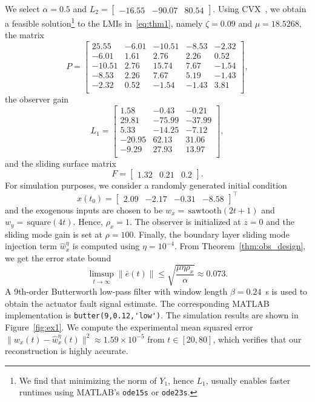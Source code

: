 \documentclass[times, doublespace]{rncauth}
\begin{document}
We select $\alpha = 0.5$ and $L_2 = \begin{bmatrix}
-16.55 & -90.07 & 80.54 
\end{bmatrix}$. Using CVX~\cite{cvx}, we obtain a feasible solution\footnote{We find that minimizing the norm of $Y_1$, hence $L_1$, usually enables faster runtimes using MATLAB's \texttt{ode15s} or \texttt{ode23s}.} to the LMIs in~\eqref{eq:thm1}, namely $\zeta = 0.09$ and $\mu=18.5268$, the matrix
\[
P = \begin{bmatrix}
25.55 & -6.01 & -10.51 & -8.53 & -2.32 \\ 
-6.01 & 1.61 & 2.76 & 2.26 & 0.52 \\ 
-10.51 & 2.76 & 15.74 & 7.67 & -1.54 \\ 
-8.53 & 2.26 & 7.67 & 5.19 & -1.43 \\ 
-2.32 & 0.52 & -1.54 & -1.43 & 3.81 \\ 
\end{bmatrix},
\]
the observer gain
\[
L_1 = \begin{bmatrix}
1.58 & -0.43 & -0.21 \\ 
29.81 & -75.99 & -37.99 \\ 
5.33 & -14.25 & -7.12 \\ 
-20.95 & 62.13 & 31.06 \\ 
-9.29 & 27.93 & 13.97 \\ 
\end{bmatrix},
\]
and the sliding surface matrix
\[
F = \begin{bmatrix}
1.32 & 0.21 & 0.2 
\end{bmatrix}.
\]
For simulation purposes, we consider a randomly generated initial condition $$x(t_0) = \begin{bmatrix}
2.09 & -2.17 & -0.31 & -8.58 
\end{bmatrix}^\top$$ and the exogenous inputs are chosen to be $w_x = \,\mathrm{sawtooth}(2t+1)$ and $w_y = \,\mathrm{square}(4t)$. Hence, $\rho_x=1$. The observer is initialized at $z = 0$ and the sliding mode gain is set at $\rho=100$. Finally, the boundary layer sliding mode injection term $\hat w^\eta_x$ is computed using $\eta = 10^{-4}$. From Theorem~\ref{thm:obs_design}, we get the error state bound
\[
\limsup_{t\to\infty} \|\bar e(t)\|\le \sqrt{\frac{\mu\eta\rho_x}{\alpha}} \approx 0.073.
\] A 9th-order Butterworth low-pass filter with window length $\beta=0.24$~s is used to obtain the actuator fault signal estimate. The corresponding MATLAB implementation is \verb|butter(9,0.12,'low')|. The simulation results are shown in Figure~\ref{fig:ex1}. We compute the experimental mean squared error $\|w_x(t)-\hat w_x^\eta(t)\|^2 \approx 1.59\times 10^{-5}$ from $t\in [20, 80]$, which verifies that our reconstruction is highly accurate.
\end{document}
